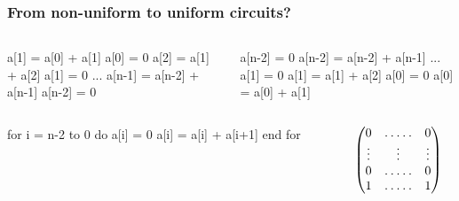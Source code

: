 \documentclass[10pt]{beamer}
\begin{document}
\begin{frame}[fragile]
  \frametitle{From non-uniform to uniform circuits?}

  \begin{columns}
    \begin{column}{0.5\textwidth}
      \begin{center}
        \begin{minipage}{0.7\textwidth}
\begin{semiverbatim}
  a[1] = a[0] + a[1]
  a[0] = 0
  a[2] = a[1] + a[2]
  a[1] = 0
  ...
  a[n-1] = a[n-2] + a[n-1]
  a[n-2] = 0
\end{semiverbatim}
        \end{minipage}
      \end{center}
    \end{column}

    \begin{column}{0.5\textwidth}
      \begin{center}
        \begin{minipage}{0.7\textwidth}
\begin{semiverbatim}
  a[n-2] = 0
  a[n-2] = a[n-2] + a[n-1]
  ...
  a[1] = 0
  a[1] = a[1] + a[2]
  a[0] = 0
  a[0] = a[0] + a[1]
\end{semiverbatim}
        \end{minipage}
      \end{center}
    \end{column}
    \end{columns}
  
  \vfill

  \begin{columns}

    \begin{column}{0.5\textwidth}
      \begin{center}
        \begin{minipage}{0.7\textwidth}
\begin{semiverbatim}
  for i = n-2 to 0 do
    a[i] = 0
    a[i] = a[i] + a[i+1]
  end for
\end{semiverbatim}
        \end{minipage}
      \end{center}
    \end{column}

    \begin{column}{0.5\textwidth}

      \begin{equation*}
        \begin{pmatrix}
          0 & \hdotsfor{3} & 0\\
          \vdots  &  &\vdots&& \vdots \\
          0 & \hdotsfor{3} & 0\\
          1 & \hdotsfor{3} & 1
        \end{pmatrix}
      \end{equation*}

    \end{column}
  \end{columns}
\end{frame}
\end{document}
